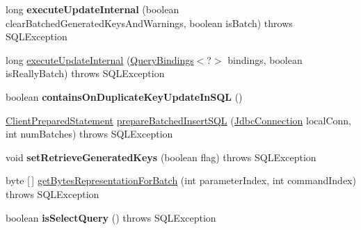 \begin{DoxyCompactItemize}
\item 
\mbox{\label{classcom_1_1mysql_1_1cj_1_1jdbc_1_1_client_prepared_statement_a6eec75c24c92ec36c85fc467e3f25512}} 
long {\bfseries execute\+Update\+Internal} (boolean clear\+Batched\+Generated\+Keys\+And\+Warnings, boolean is\+Batch)  throws S\+Q\+L\+Exception 
\item 
long \mbox{\hyperlink{classcom_1_1mysql_1_1cj_1_1jdbc_1_1_client_prepared_statement_ababbfe9c3963f27842243160c2464af1}{execute\+Update\+Internal}} (\mbox{\hyperlink{interfacecom_1_1mysql_1_1cj_1_1_query_bindings}{Query\+Bindings}}$<$?$>$ bindings, boolean is\+Really\+Batch)  throws S\+Q\+L\+Exception 
\item 
\mbox{\label{classcom_1_1mysql_1_1cj_1_1jdbc_1_1_client_prepared_statement_ab6bef693a8292d5c2438506df5936d3e}} 
boolean {\bfseries contains\+On\+Duplicate\+Key\+Update\+In\+S\+QL} ()
\item 
\mbox{\hyperlink{classcom_1_1mysql_1_1cj_1_1jdbc_1_1_client_prepared_statement}{Client\+Prepared\+Statement}} \mbox{\hyperlink{classcom_1_1mysql_1_1cj_1_1jdbc_1_1_client_prepared_statement_a43c466c6a5b4c8094dd1f0ce8963feb4}{prepare\+Batched\+Insert\+S\+QL}} (\mbox{\hyperlink{interfacecom_1_1mysql_1_1cj_1_1jdbc_1_1_jdbc_connection}{Jdbc\+Connection}} local\+Conn, int num\+Batches)  throws S\+Q\+L\+Exception 
\item 
\mbox{\label{classcom_1_1mysql_1_1cj_1_1jdbc_1_1_client_prepared_statement_afa272c129ff89181b395f2233e9220fd}} 
void {\bfseries set\+Retrieve\+Generated\+Keys} (boolean flag)  throws S\+Q\+L\+Exception 
\item 
byte \mbox{[}$\,$\mbox{]} \mbox{\hyperlink{classcom_1_1mysql_1_1cj_1_1jdbc_1_1_client_prepared_statement_a775b294248ab992f62e3ed346bce51f8}{get\+Bytes\+Representation\+For\+Batch}} (int parameter\+Index, int command\+Index)  throws S\+Q\+L\+Exception 
\item 
\mbox{\label{classcom_1_1mysql_1_1cj_1_1jdbc_1_1_client_prepared_statement_a3c78dbd07c4a62c42baf38e02fd691ea}} 
boolean {\bfseries is\+Select\+Query} ()  throws S\+Q\+L\+Exception 
\item 

\end{DoxyCompactItemize}
